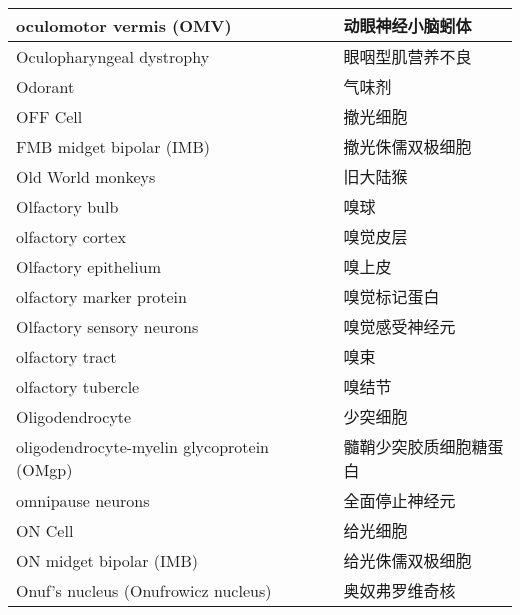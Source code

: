 \begin{longtable}{lll}
	\midrule
	oculomotor vermis (OMV)     && 动眼神经小脑蚓体   \\
	
	\midrule
	Oculopharyngeal dystrophy     && 眼咽型肌营养不良   \\
	
	\midrule
	Odorant     && 气味剂   \\
	
	\midrule
	OFF Cell     && 撤光细胞   \\
	
	\midrule
	FMB midget bipolar (IMB)   && 撤光侏儒双极细胞   \\
	
	\midrule
	Old World monkeys     && 旧大陆猴   \\
	
	\midrule
	Olfactory bulb     && 嗅球   \\
	
	\midrule
	olfactory cortex     && 嗅觉皮层   \\
	
	\midrule
	Olfactory epithelium     && 嗅上皮   \\
	
	\midrule
	olfactory marker protein     && 嗅觉标记蛋白   \\
	
	\midrule
	Olfactory sensory neurons     && 嗅觉感受神经元   \\
	
	\midrule
	olfactory tract     && 嗅束   \\
	
	\midrule
	olfactory tubercle     && 嗅结节   \\
	
	\midrule
	Oligodendrocyte     && 少突细胞   \\
	
	\midrule
	oligodendrocyte-myelin glycoprotein (OMgp)    && 髓鞘少突胶质细胞糖蛋白   \\
	
	\midrule
	omnipause neurons    && 全面停止神经元   \\
	
	\midrule
	ON Cell    && 给光细胞   \\
	
	\midrule
	ON midget bipolar (IMB)   && 给光侏儒双极细胞   \\
	
	\midrule
	Onuf’s nucleus (Onufrowicz nucleus)   && 奥奴弗罗维奇核   \\
	

\end{longtable}
